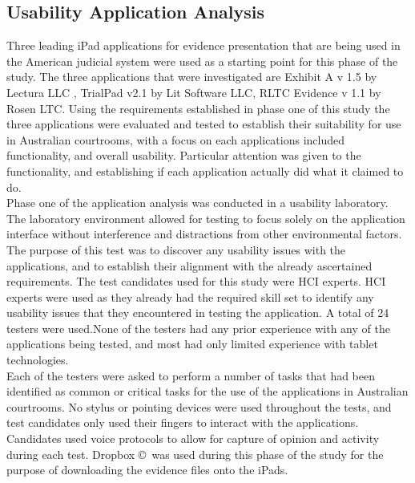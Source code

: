 \documentclass{article}
\begin{document}
\subsection{Usability Application Analysis}
Three leading iPad applications for evidence presentation that are being used in the American judicial system were used as a starting point for this phase of the study. The three applications that were investigated are Exhibit A v 1.5 by Lectura LLC ,  TrialPad v2.1 by Lit Software LLC, RLTC Evidence v 1.1 by Rosen LTC. 
Using the requirements established in phase one of this study the three applications were evaluated and tested to establish their suitability for use in Australian courtrooms, with a focus on each applications included functionality, and overall usability. Particular attention was given to the functionality, and establishing if each application actually did what it claimed to do.\\
Phase one of the application analysis was conducted in a usability laboratory. The laboratory environment allowed for testing to focus solely on the application interface without interference and distractions from other environmental factors.
The purpose of this test was to discover any usability issues with the applications, and to establish their alignment with the already ascertained requirements. The test candidates used for this study were HCI experts. HCI experts were used as they already had the required skill set to identify any usability issues that they encountered in testing the application. A total of 24 testers were used.None of the testers had any prior experience with any of the applications being tested, and most had only limited experience with tablet technologies.\\
Each of the testers were asked to perform a number of tasks that had been identified as common or critical tasks for the use of the applications in Australian courtrooms. No stylus or pointing devices were used throughout the tests, and test candidates only used their fingers to interact with the applications. Candidates used voice protocols to allow for capture of opinion and activity during each test. Dropbox \copyright\   was used during this phase of the study for the purpose of downloading the  evidence files onto the iPads.
\end{document}

